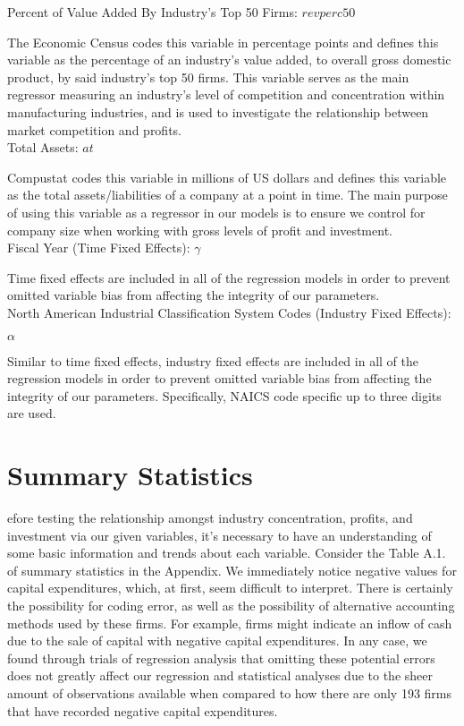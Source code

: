 \noindent Percent of Value Added By Industry's Top 50 Firms: $revperc50$

The Economic Census codes this variable in percentage points and defines this variable as the percentage of an industry’s value added, to overall gross domestic product, by said industry’s top 50 firms. This variable serves as the main regressor measuring an industry’s level of competition and concentration within manufacturing industries, and is used to investigate the relationship between market competition and profits. \\

\noindent Total Assets: $at$

Compustat codes this variable in millions of US dollars and defines this variable as the total assets/liabilities of a company at a point in time. The main purpose of using this variable as a regressor in our models is to ensure we control for company size when working with gross levels of profit and investment. \\

\noindent Fiscal Year (Time Fixed Effects): $\gamma$

Time fixed effects are included in all of the regression models in order to prevent omitted variable bias from affecting the integrity of our parameters. \\

\noindent North American Industrial Classification System Codes (Industry Fixed Effects):

\noindent $\alpha$

Similar to time fixed effects, industry fixed effects are included in all of the regression models in order to prevent omitted variable bias from affecting the integrity of our parameters. Specifically, NAICS code specific up to three digits are used.


\section{Summary Statistics}
\label{sec:sec03}

efore testing the relationship amongst industry concentration, profits, and investment via our given variables, it’s necessary to have an understanding of some basic information and trends about each variable. Consider the Table A.1. of summary statistics in the Appendix. We immediately notice negative values for capital expenditures, which, at first, seem difficult to interpret. There is certainly the possibility for coding error, as well as the possibility of alternative accounting methods used by these firms. For example, firms might indicate an inflow of cash due to the sale of capital with negative capital expenditures. In any case, we found through trials of regression analysis that omitting these potential errors does not greatly affect our regression and statistical analyses due to the sheer amount of observations available when compared to how there are only 193 firms that have recorded negative capital expenditures. \\


